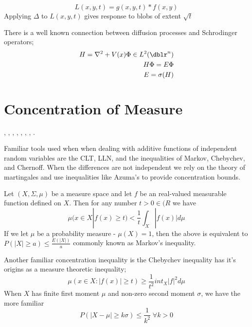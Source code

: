 \documentclass[a4paper]{article}
\newcommand{\abs}[1]{\left\vert#1\right\vert}
\theoremstyle{plain}
\theoremstyle{definition}
\theoremstyle{remark}
\numberwithin{equation}{section}
\begin{document}
\begin{equation*}
  L(x,y,t) =g(x,y,t) \ast f(x,y)
\end{equation*}
Applying $\Delta$ to $L(x,y,t)$ gives response to blobs of extent $\sqrt{t}$

There is a well known connection between diffusion processes and Schrodinger operators;
\begin{eqnarray*}
H = \nabla^2 + V(x) \Phi \in L^2(\dblr^n) \\
H \Phi = E \Phi \\
E = \sigma(H)
\end{eqnarray*}



\section{Concentration of Measure}
 \cite{MCArora04expanderflows}, \cite{MCBartlett03convexity}, \cite{MCBoucheron04concentrationinequalities},
 \cite{MCFRIEDMAN96computingbetti}, \cite{MCLedoux04spectralgap}, \cite{MCMuyan_ablessing},
 \cite{MCSinclair92improvedbounds}, \cite{MCTalagrand95concentrationof}.

Familiar tools used when when dealing with additive functions of independent random variables are the CLT, LLN, and the inequalities of Markov, Chebychev, and Chernoff.  When the differences are not independent we rely on the theory of martingales and use inequalities like Azuma's to provide concentration bounds.

Let $(X,\Sigma,\mu)$ be a measure space and let $f$ be an  real-valued measurable function defined on $X$. Then for any number $t > 0 \in \mathbb({R}$ we have
\begin{equation*}
\mu(x \in X | f(x) \geq t) < \frac{1}{t} \int_X |f(x)| d \mu
\end{equation*} If we let $\mu$ be a probability measure - $\mu(X)=1$, then the above is equivalent to $P(|X| \geq a) \leq \frac{E(|X|)}{a}$ commonly known as Markov's inequality.

Another familiar concentration inequality is the Chebychev inequality has it's origins as a measure theoretic inequality;
\begin{equation*}
\mu({x \in X : \abs{f(x)} \geq t}) \geq \frac{1}{t^2}
int_X \abs{f}^2 d\mu
\end{equation*} When $X$ has finite first moment $\mu$ and non-zero second moment $\sigma$, we have the more familiar
\begin{equation*}
P( \abs{X - \mu} \geq k \sigma ) \leq \frac{1}{k^2} \; \forall k > 0
\end{equation*}
\end{document}
